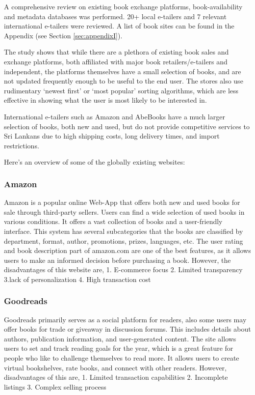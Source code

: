 
A comprehensive review on existing book exchange platforms, book-availability and
metadata databases was performed. 20+ local e-tailers and 7 relevant international
e-tailers were reviewed. A list of book sites can be found in the Appendix (see
Section \ref{sec:appendixI}).

The study shows that while there are a plethora of existing book sales and exchange
platforms, both affiliated with major book retailers/e-tailers and independent, the
platforms themselves have a small selection of books, and are not updated frequently
enough to be useful to the end user. The stores also use rudimentary `newest first'
or `most popular' sorting algorithms, which are less effective in showing what the
user is most likely to be interested in.

International e-tailers such as Amazon and AbeBooks have a much larger selection of
books, both new and used, but do not provide competitive services to Sri Lankans due
to high shipping costs, long delivery times, and import restrictions.

Here's an overview of some of the globally existing websites:

\subsubsection{Amazon}
Amazon is a popular online Web-App that offers both new and used books for sale
through third-party sellers. Users can find a wide selection of used books in
various conditions. It offers a vast collection of books and a user-friendly
interface. This system has several subcategories that the books are classified
by department, format, author, promotions, prizes, languages, etc. The user
rating and book description part of amazon.com are one of the best features, as
it allows users to make an informed decision before purchasing a book. However,
the disadvantages of this website are, 1. E-commerce focus 2. Limited
transparency 3.lack of personalization 4. High transaction cost

\subsubsection{Goodreads}
Goodreads primarily serves as a social platform for readers, also some users
may offer books for trade or giveaway in discussion forums. This includes
details about authors, publication information, and user-generated content. The
site allows users to set and track reading goals for the year, which is a great
feature for people who like to challenge themselves to read more. It allows
users to create virtual bookshelves, rate books, and connect with other
readers. However, disadvantages of this are, 1. Limited transaction
capabilities 2. Incomplete listings 3. Complex selling process

